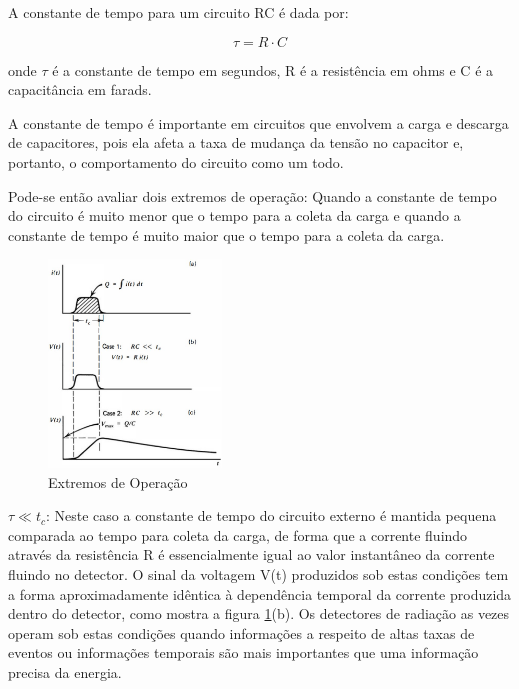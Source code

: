 \documentclass[11pt,a4paper]{article}
\begin{document}
			A constante de tempo para um circuito RC  é dada por:
			
				\begin{equation}
					\tau = R \cdot C
				\end{equation}

			\noindent onde $\tau$ é a constante de tempo em segundos, R é a resistência em ohms e C é a capacitância em farads. 
			
			A constante de tempo é importante em circuitos que envolvem a carga e descarga de capacitores, pois ela afeta a taxa de mudança da tensão no capacitor e, portanto, o comportamento do circuito como um todo.
			
			Pode-se então avaliar dois extremos de operação: Quando a constante de tempo do circuito é muito menor que o tempo para a coleta da carga e quando a constante de tempo é muito maior que o tempo para a coleta da carga.

			\begin{figure}
				\centering
				\includegraphics[width=0.41\textwidth]{Imagens/esquemaCorrentesCircuitoRC.jpg}
				\caption{Extremos de Operação}
				\label{fig:esquemaCorrenteCircuitoRC}
			\end{figure}


			$\tau \ll t_c$: Neste caso a constante de tempo do circuito externo é mantida pequena comparada ao tempo para coleta da carga, de forma que a corrente fluindo através da resistência R é essencialmente igual ao valor instantâneo da corrente fluindo no detector. O sinal da voltagem V(t) produzidos sob estas condições tem a forma aproximadamente idêntica à dependência temporal da corrente produzida dentro do detector, como mostra a figura \ref{fig:esquemaCorrenteCircuitoRC}(b). Os detectores de radiação as vezes operam sob estas condições quando informações a respeito de altas taxas de eventos ou informações temporais são mais importantes que uma informação precisa da energia.
\end{document}
